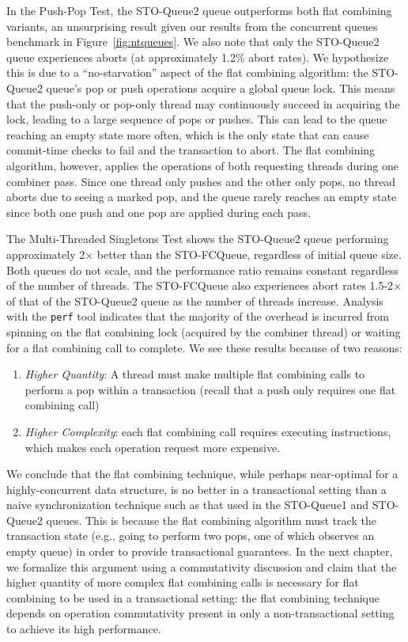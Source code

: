 In the Push-Pop Test, the STO-Queue2 queue outperforms both flat combining variants, an unsurprising result given our results from the concurrent queues benchmark in Figure~\ref{fig:ntqueues}. We also note that only the STO-Queue2 queue experiences aborts (at approximately 1.2\% abort rates). We hypothesize this is due to a ``no-starvation'' aspect of the flat combining algorithm: the STO-Queue2 queue's pop or push operations acquire a global queue lock. This means that the push-only or pop-only thread may continuously succeed in acquiring the lock, leading to a large sequence of pops or pushes. This can lead to the queue reaching an empty state more often, which is the only state that can cause commit-time checks to fail and the transaction to abort. The flat combining algorithm, however, applies the operations of both requesting threads during one combiner pass. Since one thread only pushes and the other only pops, no thread aborts due to seeing a marked pop, and the queue rarely reaches an empty state since both one push and one pop are applied during each pass.

The Multi-Threaded Singletons Test shows the STO-Queue2 queue performing approximately 2$\times$ better than the STO-FCQueue, regardless of initial queue size. Both queues do not scale, and the performance ratio remains constant regardless of the number of threads. The STO-FCQueue also experiences abort rates 1.5-2$\times$ of that of the STO-Queue2 queue as the number of threads increase.
Analysis with the \texttt{perf} tool indicates that the majority of the overhead is incurred from spinning on the flat combining lock (acquired by the combiner thread) or waiting for a flat combining call to complete. We see these results because of two reasons:
\begin{enumerate}
\item \emph{Higher Quantity}: A thread must make multiple flat combining calls to perform a pop within a transaction (recall that a push only requires one flat combining call) 
\item \emph{Higher Complexity}: each flat combining call requires executing instructions, which makes each operation request more expensive.
\end{enumerate}

We conclude that the flat combining technique, while perhaps near-optimal for a highly-concurrent data structure, is no better in a transactional setting than a naive synchronization technique such as that used in the STO-Queue1 and STO-Queue2 queues. This is because the flat combining algorithm must track the transaction state (e.g., going to perform two pops, one of which observes an empty queue) in order to provide transactional guarantees. In the next chapter, we formalize this argument using a commutativity discussion and claim that the higher quantity of more complex flat combining calls is necessary for flat combining to be used in a transactional setting: the flat combining technique depends on operation commutativity present in only a non-transactional setting to achieve its high performance. 
